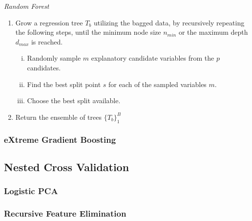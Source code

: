 \documentclass[a4paper,12pt, headsepline]{scrartcl}
\numberwithin{equation}{section}
\begin{document}

{}
\begin{algorithm}[hbt!]
	\caption{\textit{Random Forest}}\label{alg:one}
	\begin{enumerate}
		\item Grow a regression tree $T_b$ utilizing the bagged data, by recursively repeating the following steps, until the minimum node size $n_{min}$ or the maximum depth $d_{max}$ is reached.
		\begin{enumerate}[i.]
			\item Randomly sample $m$ explanatory candidate variables from the $p$ candidates.
			\item Find the best split point $s$ for each of the sampled variables $m$.
			\item Choose the best split available.
		\end{enumerate}
		\item Return the ensemble of trees $\{T_b\}_1^B$
	\end{enumerate}

\end{algorithm}

\subsubsection{eXtreme Gradient Boosting}\label{subsubsec:xgb}
\subsection{Nested Cross Validation}\label{subsec:nest}
\subsubsection{Logistic PCA}\label{subsubsec:logp}
\subsubsection{Recursive Feature Elimination}\label{subsubsec:rfe}
\end{document}
